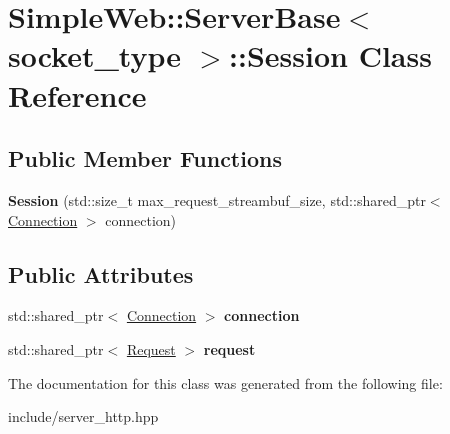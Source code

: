 \hypertarget{classSimpleWeb_1_1ServerBase_1_1Session}{}\section{Simple\+Web\+:\+:Server\+Base$<$ socket\+\_\+type $>$\+:\+:Session Class Reference}
\label{classSimpleWeb_1_1ServerBase_1_1Session}
\subsection*{Public Member Functions}
\begin{DoxyCompactItemize}
\item 
{\bfseries Session} (std\+::size\+\_\+t max\+\_\+request\+\_\+streambuf\+\_\+size, std\+::shared\+\_\+ptr$<$ \hyperlink{classSimpleWeb_1_1ServerBase_1_1Connection}{Connection} $>$ connection)\hypertarget{classSimpleWeb_1_1ServerBase_1_1Session_a9d8d4216f09ae1f9b2fabaf22a5fb1fc}{}\label{classSimpleWeb_1_1ServerBase_1_1Session_a9d8d4216f09ae1f9b2fabaf22a5fb1fc}

\end{DoxyCompactItemize}
\subsection*{Public Attributes}
\begin{DoxyCompactItemize}
\item 
std\+::shared\+\_\+ptr$<$ \hyperlink{classSimpleWeb_1_1ServerBase_1_1Connection}{Connection} $>$ {\bfseries connection}\hypertarget{classSimpleWeb_1_1ServerBase_1_1Session_a5c9720220dd309be1d82789a44784617}{}\label{classSimpleWeb_1_1ServerBase_1_1Session_a5c9720220dd309be1d82789a44784617}

\item 
std\+::shared\+\_\+ptr$<$ \hyperlink{classSimpleWeb_1_1ServerBase_1_1Request}{Request} $>$ {\bfseries request}\hypertarget{classSimpleWeb_1_1ServerBase_1_1Session_aeccd8812ff6944eb3350be9e7bf76f75}{}\label{classSimpleWeb_1_1ServerBase_1_1Session_aeccd8812ff6944eb3350be9e7bf76f75}

\end{DoxyCompactItemize}


The documentation for this class was generated from the following file\+:\begin{DoxyCompactItemize}
\item 
include/server\+\_\+http.\+hpp\end{DoxyCompactItemize}
